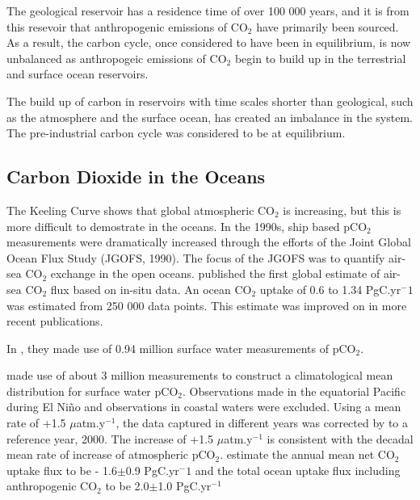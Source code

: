 \documentclass[11pt, a4paper]{article}
\numberwithin{figure}{section}
\numberwithin{table}{section}
\begin{document}
The geological reservoir has a residence time of over 100 000 years, and it is 
from this resevoir that anthropogenic emissions of CO$_2$ have primarily been 
sourced. 
As a result, the carbon cycle, once considered to have been in 
equilibrium, is now unbalanced as anthropogeic emissions of CO$_2$ begin to 
build up in the terrestrial and surface ocean reservoirs.

The build up of carbon in reservoirs with time scales shorter than geological, 
such as the atmosphere and the surface ocean, has created an imbalance in the system.
The pre-industrial carbon cycle was considered to be at equilibrium.

\subsection{Carbon Dioxide in the Oceans}
The Keeling Curve shows that global atmospheric CO$_2$ is increasing, but 
this is more difficult to demostrate in the oceans. 
In the 1990s, ship based pCO$_2$ 
measurements were dramatically increased through the efforts of the Joint 
Global Ocean Flux Study (JGOFS, 1990).
The focus of the JGOFS was to quantify air-sea CO$_2$ exchange in the open 
oceans.
\citet{Takahashi1997}%
published the first global estimate of air-sea CO$_2$ 
flux based on in-situ data. 
An ocean CO$_2$ uptake of 0.6 to 1.34 PgC.yr$^-1$ 
was estimated from 250 000 data points. 
This estimate was improved on in more recent publications. 

In 
\citet{Takahashi2002}%
, they made use of 0.94 million surface water 
measurements of pCO$_2$.

\citet{Takahashi2009}%
made use of about 3 million measurements to construct a 
climatological mean distribution for surface water pCO$_2$.
Observations made in the equatorial Pacific during El Ni\~{n}o and observations 
in coastal waters were excluded.
Using a mean rate of +1.5 $\mu$atm.y$^{-1}$, the data captured in different 
years was corrected by 
\citet{Takahashi2009}%
to a reference year, 2000. 
The increase of +1.5 $\mu$atm.y$^{-1}$ is consistent with the decadal mean rate of 
increase of atmospheric pCO$_2$. 
\citet{Takahashi2009}%
estimate the annual mean net CO$_2$ uptake flux to be -
1.6$\pm$0.9 PgC.yr$^-1$ and the total ocean uptake flux including anthropogenic 
CO$_2$ to be 2.0$\pm$1.0 PgC.yr$^{-1}$
\end{document}
